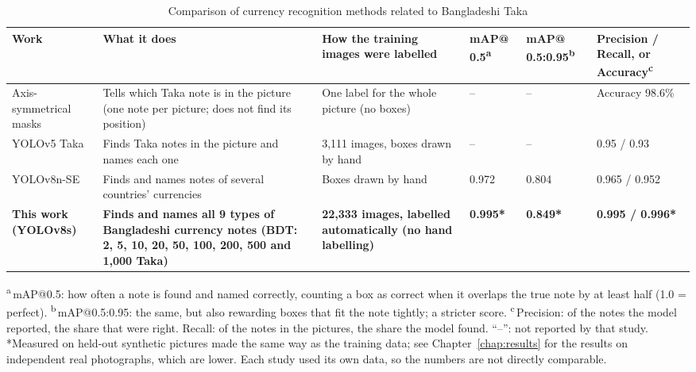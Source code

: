 \begin{table}[!htbp]
\centering
\caption{Comparison of currency recognition methods related to Bangladeshi Taka}
\label{tab:currency_compare}
\small
\begin{tabular}{|L{2.3cm}|L{3.2cm}|L{2.3cm}|L{1.7cm}|L{1.7cm}|L{2.1cm}|}
\hline
\textbf{Work} & \textbf{What it does} & \textbf{How the training images were labelled} & \textbf{mAP@ 0.5\textsuperscript{a}} & \textbf{mAP@ 0.5:0.95\textsuperscript{b}} & \textbf{Precision / Recall, or Accuracy\textsuperscript{c}} \\ \hline
Axis-symmetrical masks \cite{axissym} & Tells which Taka note is in the picture (one note per picture; does not find its position) & One label for the whole picture (no boxes) & -- & -- & Accuracy 98.6\% \\ \hline
YOLOv5 Taka \cite{nstubdtaka2024} & Finds Taka notes in the picture and names each one & 3,111 images, boxes drawn by hand & -- & -- & 0.95 / 0.93 \\ \hline
YOLOv8n-SE \cite{yolov8nse} & Finds and names notes of several countries' currencies & Boxes drawn by hand & 0.972 & 0.804 & 0.965 / 0.952 \\ \hline
\textbf{This work (YOLOv8s)} & \textbf{Finds and names all 9 types of Bangladeshi currency notes (BDT: 2, 5, 10, 20, 50, 100, 200, 500 and 1,000 Taka)} & \textbf{22,333 images, labelled automatically (no hand labelling)} & \textbf{0.995*} & \textbf{0.849*} & \textbf{0.995 / 0.996*} \\ \hline
\end{tabular}

\vspace{2pt}
\raggedright{\footnotesize
\textsuperscript{a}\,mAP@0.5: how often a note is found and named correctly, counting a box as correct when it overlaps the true note by at least half (1.0 = perfect).
\textsuperscript{b}\,mAP@0.5:0.95: the same, but also rewarding boxes that fit the note tightly; a stricter score.
\textsuperscript{c}\,Precision: of the notes the model reported, the share that were right. Recall: of the notes in the pictures, the share the model found. ``--'': not reported by that study.\\
*Measured on held-out synthetic pictures made the same way as the training data; see Chapter~\ref{chap:results} for the results on independent real photographs, which are lower. Each study used its own data, so the numbers are not directly comparable.}
\end{table}
\FloatBarrier

